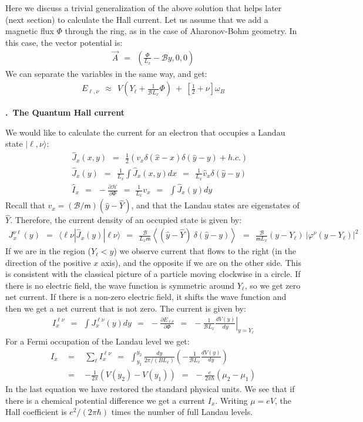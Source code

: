 \documentclass[onecolumn,fleqn, 11pt]{revtex4}
\newcommand{\mass}{\mathsf{m}}
\newcommand{\beq}{\begin{eqnarray}}
\newcommand{\eeq}{\end{eqnarray}}
\renewcommand{\thesubsection}{\arabic{subsection}}
\renewcommand{\thesubsubsection}{\arabic{subsubsection}}
\newcommand{\sheadC}[1]
{
\addtocounter{subsubsection}{1}
\vspace{5mm}
{\bf \thesubsection.\thesubsubsection \ #1}  
\nopagebreak
\phantomsection
}
\begin{document}
Here we discuss a trivial generalization 
of the above solution that helps later (next section) 
to calculate the Hall current. 
Let us assume that we add a magnetic flux ${\Phi}$ through the ring, 
as in the case of Aharonov-Bohm geometry. In this case, 
the vector potential is:
\beq
\vec{A} \ \ = \ \ \left(\frac{\Phi}{L_x}-\mathcal{B}y ,0,0\right) 
\eeq
We can separate the variables in the same way, and get:
\beq
E_{\ell,\nu} \ \ \approx \ \ V\left( Y_{\ell}
+ \frac{1}{\mathcal{B}L_x} \Phi \right ) 
\ + \ \left[ \frac{1}{2} + \nu \right] \omega_B 
\eeq





\sheadC{The Quantum Hall current}

We would like to calculate the current for an electron 
that occupies a Landau state ${| \ell, \nu \rangle}$:
\beq
&& \hat{J}_{x}(x,y) 
\ \ = \ \ 
\frac{1}{2}(v_x\delta(\hat{x}-x)\delta (\hat{y}-y)+h.c.) 
\\ \nonumber
&& \hat{J}_{x}(y) 
\ \ = \ \ 
\frac{1}{L_x} \int{\hat{J}_x(x,y) dx} 
\ \ = \ \ 
\frac{1}{L_x} \hat{v}_x \delta (\hat{y}-y) 
\\ \nonumber
&& \hat{I}_{x} 
\ \ = \ \ 
- \frac{\partial \mathcal{H}}{ \partial \Phi } 
\ \ = \,\,
\frac{1}{L_x}v_x
\ \ = \ \ 
\int \hat{J}_x(y) dy 
\eeq
Recall that ${v_x = (\mathcal{B}/\mass) (\hat{y}-\hat{Y})}$,  
and that the Landau states are eigenstates of ${\hat{Y}}$. 
Therefore, the current density of an occupied state is given by:
\beq
J_{x}^{\nu \ell}(y) 
\ \ = \ \ \langle {\ell\nu} | \hat{J}_{x}(y) | \ell \nu \rangle
\ \ = \ \ \frac{\mathcal{B} }{L_x\mass} 
\left\langle (\hat{y}-\hat{Y}) \ 
\delta (\hat{y}-y) \right \rangle 
\ \ = \ \ \frac{\mathcal{B} }{\mass L_x } (y-Y_{\ell}) \ 
\left| \varphi^{\nu}(y-Y_{\ell}) \right|^2 
\eeq
If we are in the region (${Y_{\ell}<y}$) we observe 
current that flows to the right (in the direction of the positive $x$ axis), 
and the opposite if we are on the other side. This is consistent 
with the classical picture of a particle moving clockwise in a circle. 
If there is no electric field, the wave function is symmetric 
around ${Y_{\ell}}$, so we get zero net current. 
If there is a non-zero electric field, it shifts the wave 
function and then we get a net current that is not zero. 
The current is given by:
\beq
I^{\ell\nu}_x \ \ = \ \ \int J^{\ell\nu}_x(y) dy 
\ \ = \ \ -\frac{\partial{E_{\ell\nu}}}{ \partial{\Phi} }
\ \ = \ \ - \frac{ 1 }{\mathcal{B}L_x} \left. \frac{dV(y)}{dy} \right|_{y=Y_{\ell}} 
\eeq
For a Fermi occupation of the Landau level we get:
\beq
I_{x} & \ \ = \ \ & \sum_{\ell} I_{x}^{\ell\nu}
\ \ = \ \ \int_{ y_1}^{y_2} \frac{dy } { 2\pi / (BL_x) } \left( - \frac{1}{\mathcal{B}L_x} \frac{ dV(y) } { dy } \right ) 
\\ \nonumber
& \ \ = \ \ & - \frac{1}{ 2\pi } (V(y_2)-V(y_1)) 
\ \ = \ \ - \frac{e}{2\pi\hbar} (\mu_2-\mu_1) 
\eeq
In the last equation we have restored the standard physical units. 
We see that if there is a chemical potential difference we get 
a current ${I_x}$. Writing $\mu=eV$, the Hall coefficient 
is ${e^2/(2\pi\hbar)}$ times the number of full Landau levels. 
\end{document}
